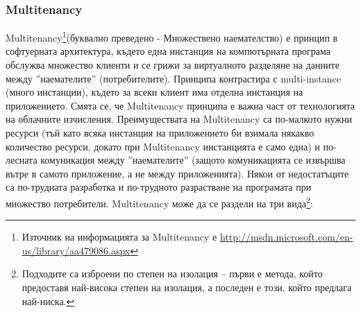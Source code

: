 \documentclass[pdftex,14pt,a4paper]{extreport}
\begin{document}
\subsubsection {Multitenancy}
Multitenancy\footnote{Източник на информацията за Multitenancy е \url{http://msdn.microsoft.com/en-us/library/aa479086.aspx}}(буквално преведено - Множествено наемателство) е принцип в софтуерната архитектура, където една инстанция на компютърната програма обслужва множество клиенти и се грижи за виртуалното разделяне на данните между ''наемателите'' (потребителите). Принципа контрастира с multi-instance (много инстанции), където за всеки клиент има отделна инстанция на приложението. Смята се, че Multitenancy принципа е важна част от технологията на облачните изчисления. Преимуществата на Multitenancy са по-малкото нужни ресурси (тъй като всяка инстанция на приложението би взимала някакво количество ресурси, докато при Multitenancy инстанцията е само една) и по-лесната комуникация между ''наемателите'' (защото комуникацията се извършва вътре в самото приложение, а не между приложенията). Някои от недостатъците са по-трудната разработка и по-трудното разрастване на програмата при множество потребители. Multitenancy може да се раздели на три вида\footnote{Подходите са изброени по степен на изолация -- първи е метода, който предоставя най-висока степен на изолация, а последен е този, който предлага най-ниска.}:
\end{document}
